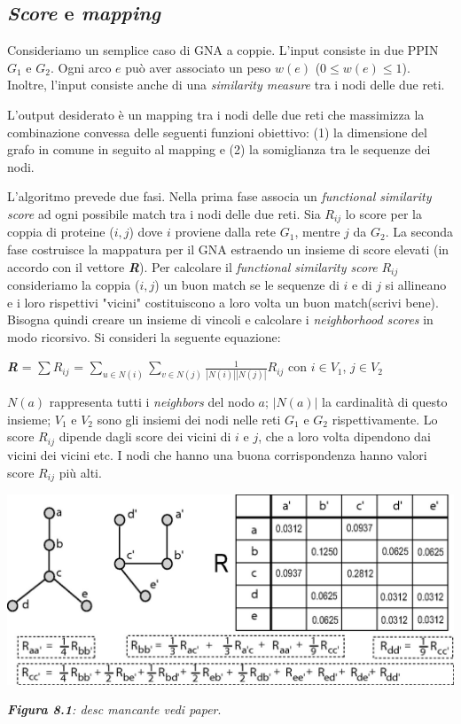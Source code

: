 \documentclass[11pt]{article}
\begin{document}
\subsection{\textit{Score} e \textit{mapping}}
Consideriamo un semplice caso di GNA a coppie. L'input consiste in due PPIN $G_1$ e $G_2$. Ogni arco $e$ può aver associato un peso $w(e)$ ($0\leq w(e) \leq1$). Inoltre, l'input consiste anche di una \textit{similarity measure} tra i nodi delle due reti.

L'output desiderato è un mapping tra i nodi delle due reti che massimizza la combinazione convessa delle seguenti funzioni obiettivo: (1) la dimensione del grafo in comune in seguito al mapping e (2) la somiglianza tra le sequenze dei nodi.

L'algoritmo prevede due fasi. Nella prima fase associa un \textit{functional similarity score} ad ogni possibile match tra i nodi delle due reti. Sia $R_{ij}$ lo score per la coppia di proteine ($i,j$) dove $i$ proviene dalla rete $G_1$, mentre $j$ da $G_2$. La seconda fase costruisce la mappatura per il GNA estraendo un insieme di score elevati (in accordo con il vettore \textit{\textbf{R}}).
Per calcolare il \textit{functional similarity score} $R_{ij}$ consideriamo la coppia ($i,j$) un buon match se le sequenze di $i$ e di $j$ si allineano e i loro rispettivi "vicini" costituiscono a loro volta un buon match(scrivi bene). Bisogna quindi creare un insieme di vincoli e calcolare i \textit{neighborhood scores} in modo ricorsivo. Si consideri la seguente equazione:

\begin{center}
\textit{\textbf{R}} = $\sum R_{ij}$ = $\displaystyle{\sum_{u \in N(i)}} \displaystyle{\sum_{v \in N(j)}\frac{1}{|N(i)||N(j)|} R_{ij}}$ con $i \in V_1$, $j \in V_2$
\end{center}

$N(a)$ rappresenta tutti i \textit{neighbors} del nodo $a$; $|N(a)|$ la cardinalità di questo insieme; $V_1$ e $V_2$ sono gli insiemi dei nodi nelle reti $G_1$ e $G_2$ rispettivamente. Lo score $R_{ij}$ dipende dagli score dei vicini di $i$ e $j$, che a loro volta dipendono dai vicini dei vicini etc. I nodi che hanno una buona corrispondenza hanno valori score $R_{ij}$ più alti.

\begin{center}
\includegraphics[scale=0.36]{isorank}

\begin{small}\textit{\textbf{Figura 8.1}: desc mancante vedi paper}.\end{small}
\end{center}
\end{document}
